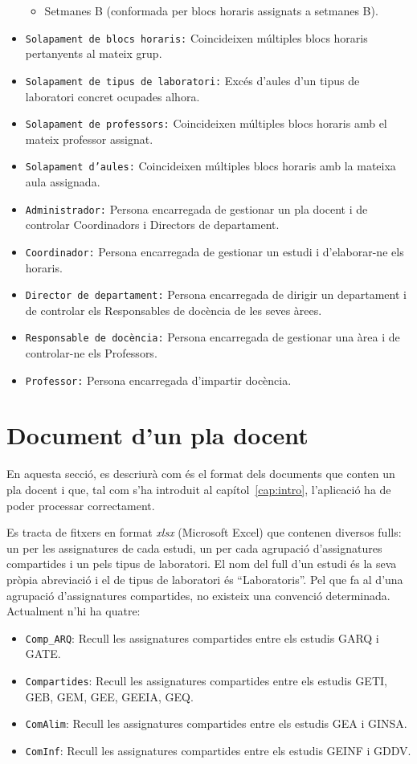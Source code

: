 \documentclass[a4paper,12pt]{ThesisStyle}
\begin{document}
\begin{itemize}
\begin{itemize}
    \item Setmanes B (conformada per blocs horaris assignats a setmanes B).
  \end{itemize}
  \item \texttt{Solapament de blocs horaris:} Coincideixen múltiples blocs horaris pertanyents al mateix grup.
  \item \texttt{Solapament de tipus de laboratori:} Excés d'aules d'un tipus de laboratori concret ocupades alhora.
  \item \texttt{Solapament de professors:} Coincideixen múltiples blocs horaris amb el mateix professor assignat.
  \item \texttt{Solapament d'aules:} Coincideixen múltiples blocs horaris amb la mateixa aula assignada.
  \item \texttt{Administrador:} Persona encarregada de gestionar un pla docent i de controlar Coordinadors i Directors de departament.
  \item \texttt{Coordinador:} Persona encarregada de gestionar un estudi i d'elaborar-ne els horaris.
  \item \texttt{Director de departament:} Persona encarregada de dirigir un departament i de controlar els Responsables de docència de les seves àrees.
  \item \texttt{Responsable de docència:} Persona encarregada de gestionar una àrea i de controlar-ne els Professors.
  \item \texttt{Professor:} Persona encarregada d'impartir docència.
\end{itemize}

\section{Document d'un pla docent}
\label{sec:document_pla_docent}

En aquesta secció, es descriurà com és el format dels documents que conten un pla docent i que, tal com s'ha introduit al capítol~\ref{cap:intro}, l'aplicació ha de poder processar correctament.

Es tracta de fitxers en format \emph{xlsx} (Microsoft Excel) que contenen diversos fulls: un per les assignatures de cada estudi, un per cada agrupació d'assignatures compartides i un pels tipus de laboratori. El nom del full d'un estudi és la seva pròpia abreviació i el de tipus de laboratori és ``Laboratoris''. Pel que fa al d'una agrupació d'assignatures compartides, no existeix una convenció determinada. Actualment n'hi ha quatre:
\begin{itemize}
  \item \texttt{Comp\_ARQ}: Recull les assignatures compartides entre els estudis GARQ i GATE.
  \item \texttt{Compartides}: Recull les assignatures compartides entre els estudis GETI, GEB, GEM, GEE, GEEIA, GEQ.
  \item \texttt{ComAlim}: Recull les assignatures compartides entre els estudis GEA i GINSA.
  \item \texttt{ComInf}: Recull les assignatures compartides entre els estudis GEINF i GDDV.
\end{itemize}
\end{document}
